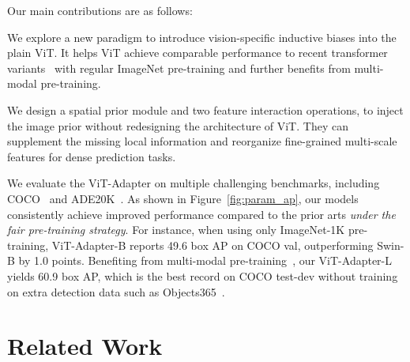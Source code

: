 \documentclass{article} \usepackage{iclr2023_conference,times}
\begin{document}
Our main contributions are as follows:

 We explore a new paradigm to introduce vision-specific inductive biases into the plain ViT. It helps ViT achieve comparable performance to recent transformer variants~\citep{liu2021swin, wang2021pvtv2} with regular ImageNet pre-training and further benefits from multi-modal pre-training.

 We design a spatial prior module and two feature interaction operations, to inject the image prior without redesigning the architecture of ViT. They can supplement the missing local information and reorganize fine-grained multi-scale features for dense prediction tasks.

 We evaluate the ViT-Adapter on multiple challenging benchmarks, including COCO~\citep{lin2014microsoft} and ADE20K~\citep{zhou2017scene}.
As shown in Figure~\ref{fig:param_ap}, our models consistently achieve improved performance compared to the prior arts \emph{under the fair pre-training strategy}.
For instance, when using only ImageNet-1K pre-training, ViT-Adapter-B reports 49.6 box AP on COCO val, outperforming Swin-B by 1.0 points.
Benefiting from multi-modal pre-training~\citep{peng2022beitv2}, our ViT-Adapter-L yields 60.9 box AP, which is the best record on COCO test-dev without training on extra detection data such as Objects365~\citep{shao2019objects365}.




\vspace{-1em}
\section{Related Work}
\end{document}
